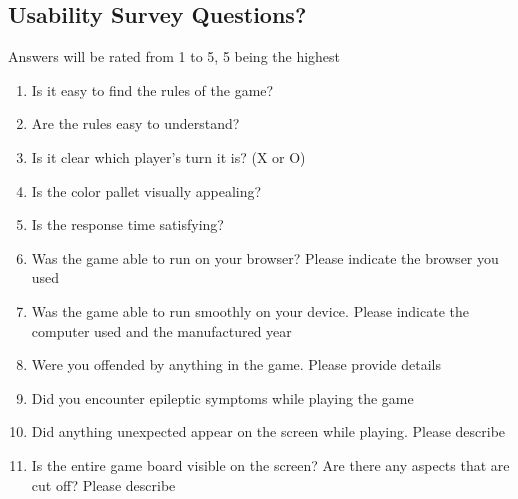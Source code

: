 \documentclass[12pt, titlepage]{article}
\begin{document}
\subsection{Usability Survey Questions?}
Answers will be rated from 1 to 5, 5 being the highest
\begin{enumerate}
\item
Is it easy to find the rules of the game? \label{question:q1}
\item
Are the rules easy to understand? \label{question:q2}
\item
Is it clear which player's turn it is? (X or O) \label{question:q3}
\item
Is the color pallet visually appealing? \label{question:q4}
\item
Is the response time satisfying? \label{question:q5}
\item
Was the game able to run on your browser? Please indicate the browser you used \label{question:q6}
\item
Was the game able to run smoothly on your device. Please indicate the computer used and the manufactured year \label{question:q7}
\item
Were you offended by anything in the game. Please provide details \label{question:q8}
\item
Did you encounter epileptic symptoms while playing the game \label{question:q9}
\item
Did anything unexpected appear on the screen while playing. Please describe \label{question:q10}
\item
Is the entire game board visible on the screen? Are there any aspects that are cut off? Please describe \label{question:q11}


\end{enumerate}
\end{document}
